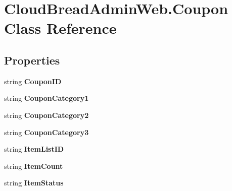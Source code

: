 \hypertarget{a00068}{}\section{Cloud\+Bread\+Admin\+Web.\+Coupon Class Reference}
\label{a00068}
\subsection*{Properties}
\begin{DoxyCompactItemize}
\item 
string {\bfseries Coupon\+ID}\hypertarget{a00068_a00ef24076e2d2f7de93782d96ea876b0}{}\label{a00068_a00ef24076e2d2f7de93782d96ea876b0}

\item 
string {\bfseries Coupon\+Category1}\hypertarget{a00068_a53445be4ae15a2211a6646740d4f5460}{}\label{a00068_a53445be4ae15a2211a6646740d4f5460}

\item 
string {\bfseries Coupon\+Category2}\hypertarget{a00068_a40901c1efae043606bf3f842518c90d0}{}\label{a00068_a40901c1efae043606bf3f842518c90d0}

\item 
string {\bfseries Coupon\+Category3}\hypertarget{a00068_a276a5a5df1f271efe95dc75bfa64a2fc}{}\label{a00068_a276a5a5df1f271efe95dc75bfa64a2fc}

\item 
string {\bfseries Item\+List\+ID}\hypertarget{a00068_a3062bc65d83596bdc042f897719bd503}{}\label{a00068_a3062bc65d83596bdc042f897719bd503}

\item 
string {\bfseries Item\+Count}\hypertarget{a00068_ac20e7c5e435b933c334b2ea1092bb0f1}{}\label{a00068_ac20e7c5e435b933c334b2ea1092bb0f1}

\item 
string {\bfseries Item\+Status}\hypertarget{a00068_af07730b70b8569b232fcb2576fabc5c2}{}\label{a00068_af07730b70b8569b232fcb2576fabc5c2}


\end{DoxyCompactItemize}
